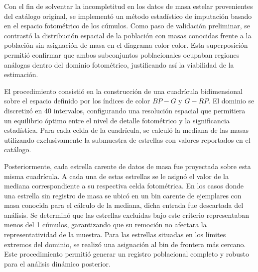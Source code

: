             Con el fin de solventar la incompletitud en los datos de masa 
            estelar provenientes del catálogo original, se implementó un método 
            estadístico de imputación basado en el espacio fotométrico de los 
            cúmulos. Como paso de validación preliminar, se contrastó la 
            distribución espacial de la población con masas conocidas frente a 
            la población sin asignación de masa en el diagrama color-color. Esta 
            superposición permitió confirmar que ambos subconjuntos 
            poblacionales ocupaban regiones análogas dentro del dominio 
            fotométrico, justificando así la viabilidad de la estimación.

            El procedimiento consistió en la construcción de una cuadrícula 
            bidimensional sobre el espacio definido por los índices de color 
            $BP-G$ y $G-RP$. El dominio se discretizó en 40 intervalos, 
            configurando una resolución espacial que permitiera un equilibrio 
            óptimo entre el nivel de detalle fotométrico y la significancia 
            estadística. Para cada celda de la cuadrícula, se calculó la mediana 
            de las masas utilizando exclusivamente la submuestra de estrellas 
            con valores reportados en el catálogo.

            Posteriormente, cada estrella carente de datos de masa fue 
            proyectada sobre esta misma cuadrícula. A cada una de estas 
            estrellas se le asignó el valor de la mediana correspondiente a su 
            respectiva celda fotométrica. En los casos donde una estrella sin 
            registro de masa se ubicó en un bin carente de ejemplares con masa 
            conocida para el cálculo de la mediana, dicha entrada fue descartada 
            del análisis. Se determinó que las estrellas excluidas bajo este 
            criterio representaban menos del 1 %
            cúmulos, garantizando que su remoción no afectara la 
            representatividad de la muestra. Para las estrellas situadas en los 
            límites extremos del dominio, se realizó una asignación al bin de 
            frontera más cercano. Este procedimiento permitió generar un 
            registro poblacional completo y robusto para el análisis dinámico 
            posterior.
        
